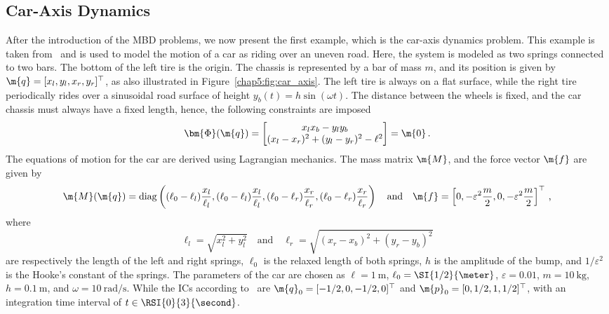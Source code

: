 \subsection{Car-Axis Dynamics}

After the introduction of the \ac{MBD} problems, we now present the first example, which is the car-axis dynamics problem. This example is taken from~\cite{lioen1998test, mazzia2008test} and is used to model the motion of a car as riding over an uneven road. Here, the system is modeled as two springs connected to two bars. The bottom of the left tire is the origin. The chassis is represented by a bar of mass $m$, and its position is given by $\m{q} = [x_l, y_l, x_r, y_r]^\top$, as also illustrated in Figure~\ref{chap5:fig:car_axis}. The left tire is always on a flat surface, while the right tire periodically rides over a sinusoidal road surface of height $y_b(t) = h\sin(\omega t)$. The distance between the wheels is fixed, and the car chassis must always have a fixed length, hence, the following constraints are imposed
%
\begin{equation*}
  \bm{\Phi}(\m{q}) = \begin{bmatrix}
    x_l x_b - y_l y_b \\
    (x_l - x_r)^2 + (y_l - y_r)^2 - \ell^2
  \end{bmatrix} = \m{0} \, \text{.}
\end{equation*}
%
The equations of motion for the car are derived using Lagrangian mechanics. The mass matrix $\m{M}$, and the force vector $\m{f}$ are given by
%
\begin{equation*}
  \m{M}(\m{q}) = \mathrm{diag}\left(
    (\ell_0-\ell_l)\dfrac{x_l}{\ell_l},
    (\ell_0-\ell_l)\dfrac{x_l}{\ell_l},
    (\ell_0-\ell_r)\dfrac{x_r}{\ell_r},
    (\ell_0-\ell_r)\dfrac{x_r}{\ell_r}
  \right)
  \quad \text{and} \quad
  \m{f} = \left[
    0, -\varepsilon^2\dfrac{m}{2},
    0, -\varepsilon^2\dfrac{m}{2}
  \right]^{\top}
  \, \text{,}
\end{equation*}
%
where
%
\begin{equation*}
  \ell_l = \sqrt{x_l^2 + y_l^2}
  \quad \text{and} \quad
  \ell_r = \sqrt{(x_r - x_b)^2 + (y_r - y_b)^2}
\end{equation*}
%
are respectively the length of the left and right springs, $\ell_0$ is the relaxed length of both springs, $h$ is the amplitude of the bump, and $1/\varepsilon^2$ is the Hooke's constant of the springs. The parameters of the car are chosen as $\ell = \SI{1}{\meter}$, $\ell_0 = \SI{1/2}{\meter}$, $\varepsilon = 0.01$, $m = \SI{10}{\kilo\gram}$, $h = \SI{0.1}{\meter}$, and $\omega = \SI{10}{\radian\per\second}$. While the \acp{IC} according to~\cite{lioen1998test, mazzia2008test} are $\m{q}_0 = [-1/2, 0, -1/2, 0]^\top$ and $\m{p}_0 = [0, 1/2, 1, 1/2]^\top$, with an integration time interval of $t \in \RSI{0}{3}{\second}$.

